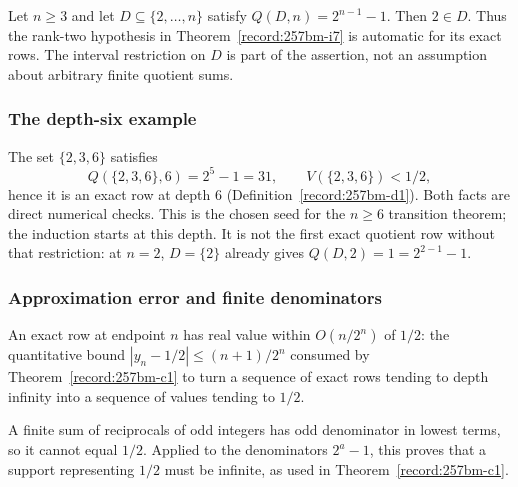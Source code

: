 \begin{prop}\label{record:257bm-i-rank2}
Let $n\ge3$ and let $D\subseteq\{2,\ldots,n\}$ satisfy
$Q(D,n)=2^{n-1}-1$.  Then $2\in D$.
Thus the rank-two hypothesis in Theorem~\ref{record:257bm-i7}
is automatic for its exact rows.  The interval restriction on
$D$ is part of the assertion, not an assumption about arbitrary
finite quotient sums.
\end{prop}

\subsubsection*{The depth-six example}

\begin{defn}\label{record:257bm-i-seed}
The set $\{2,3,6\}$ satisfies
\[
\ensuremath{Q}(\{2,3,6\},6) = 2^5-1 = 31,\qquad \ensuremath{V}(\{2,3,6\}) < 1/2,
\]
hence it is an exact row at depth $6$ (Definition~\ref{record:257bm-d1}).
Both facts are direct numerical checks.
This is the chosen seed for the $n\ge6$ transition theorem; the induction
starts at this depth.  It is not the first
exact quotient row without that restriction: at $n=2$, $D=\{2\}$ already
gives $Q(D,2)=1=2^{2-1}-1$.
\par\noindent   {} 
\end{defn}

\subsubsection*{Approximation error and finite denominators}

\begin{prop}\label{record:257bm-i9}
An exact row at endpoint $n$ has real value within $O(n/2^n)$ of $1/2$: the quantitative bound
$|y_n-1/2|\le(n+1)/2^n$ consumed by Theorem~\ref{record:257bm-c1} to turn a sequence of exact rows tending to depth
infinity into a sequence of values tending to $1/2$.
\end{prop}

\begin{prop}\label{record:257bm-i10}
A finite sum of reciprocals of odd integers has odd denominator in
lowest terms, so it cannot equal $1/2$. Applied to the denominators
$2^a-1$, this proves that a support representing $1/2$ must be infinite,
as used in Theorem~\ref{record:257bm-c1}.
\end{prop}

